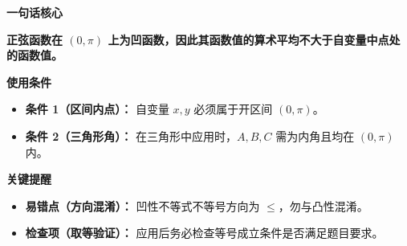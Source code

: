 \begin{summarybox}
\textbf{\textcolor{CSummary}{一句话核心}}

\textbf{正弦函数在 $(0, \pi)$ 上为凹函数，因此其函数值的算术平均不大于自变量中点处的函数值。}

\medskip
\textbf{\textcolor{CSummary}{使用条件}}
\begin{itemize}[leftmargin=*, itemsep=0.5em, topsep=0.4em]
    \item \textbf{条件 1（区间内点）：} 自变量 $x, y$ 必须属于开区间 $(0, \pi)$。
    \item \textbf{条件 2（三角形角）：} 在三角形中应用时，$A, B, C$ 需为内角且均在 $(0, \pi)$ 内。
\end{itemize}

\medskip
\textbf{\textcolor{CSummary}{关键提醒}}
\begin{itemize}[leftmargin=*, itemsep=0.5em, topsep=0.4em]
    \item \textbf{易错点（方向混淆）：} 凹性不等式不等号方向为 $\leq$，勿与凸性混淆。
    \item \textbf{检查项（取等验证）：} 应用后务必检查等号成立条件是否满足题目要求。
\end{itemize}
\end{summarybox}
